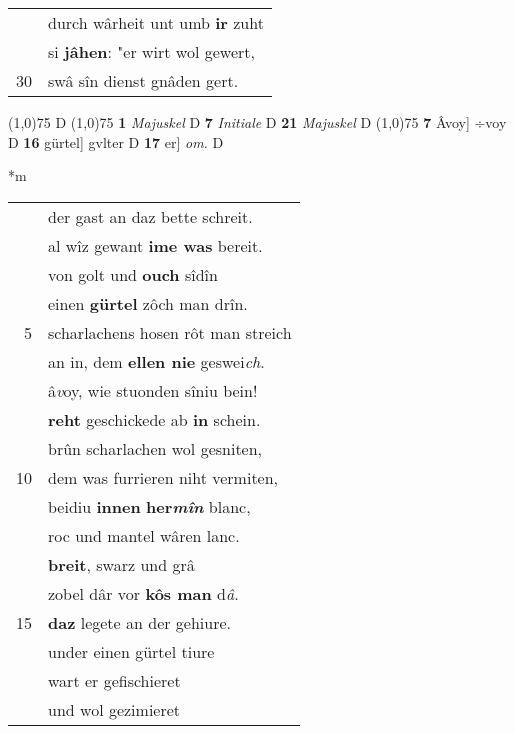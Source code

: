 \documentclass[8pt,a4paper,notitlepage]{article}
\begin{document}
\begin{table}[ht]
\begin{minipage}[t]{0.5\linewidth}
\begin{tabular}{rl}
 & durch wârheit unt umb \textbf{ir} zuht\\ 
 & si \textbf{jâhen}: "er wirt wol gewert,\\ 
30 & swâ sîn dienst gnâden gert.\\ 
\end{tabular}
\scriptsize
\line(1,0){75} \newline
D \newline
\line(1,0){75} \newline
\textbf{1} \textit{Majuskel} D  \textbf{7} \textit{Initiale} D  \textbf{21} \textit{Majuskel} D  \newline
\line(1,0){75} \newline
\textbf{7} Âvoy] ÷voy D \textbf{16} gürtel] gvlter D \textbf{17} er] \textit{om.} D \newline
\end{minipage}
\hspace{0.5cm}
\begin{minipage}[t]{0.5\linewidth}
\small
\begin{center}*m
\end{center}
\begin{tabular}{rl}
 & der gast an daz bette schreit.\\ 
 & al wîz gewant \textbf{ime was} bereit.\\ 
 & von golt und \textbf{ouch} sîdîn\\ 
 & einen \textbf{gürtel} zôch man drîn.\\ 
5 & scharlachens hosen rôt man streich\\ 
 & an in, dem \textbf{ellen nie} geswei\textit{ch}.\\ 
 & â\textit{v}oy, wie stuonden sîniu bein!\\ 
 & \textbf{reht} geschickede ab \textbf{in} schein.\\ 
 & brûn scharlachen wol gesniten,\\ 
10 & dem was furrieren niht vermiten,\\ 
 & beidiu \textbf{innen} \textbf{her\textit{mîn}} blanc,\\ 
 & roc und mantel wâren lanc.\\ 
 & \textbf{breit}, swarz und grâ\\ 
 & zobel dâr vor \textbf{kôs man} d\textit{â}.\\ 
15 & \textbf{daz} legete an der gehiure.\\ 
 & under einen gürtel tiure\\ 
 & wart er gefischieret\\ 
 & und wol gezimieret\\ 

\end{tabular}
\end{minipage}
\end{table}
\end{document}

